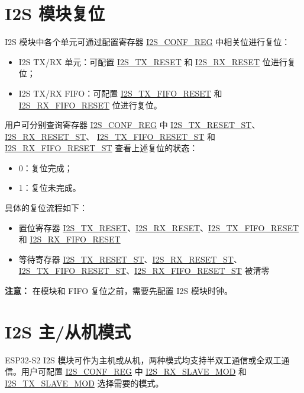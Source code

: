 \documentclass[main\_\_CN.tex]{subfiles}
\begin{document}
\section{I2S 模块复位} \label{module_reset}

I2S 模块中各个单元可通过配置寄存器 \hyperref[regdesc:I2SCONFREG]{I2S\_CONF\_REG} 中相关位进行复位：
\begin{itemize}
\item I2S TX/RX 单元：可配置 \hyperref[fielddesc:I2STXRESET]{I2S\_TX\_RESET} 和 \hyperref[fielddesc:I2SRXRESET]{I2S\_RX\_RESET} 位进行复位；
\item I2S TX/RX FIFO：可配置 \hyperref[fielddesc:I2STXFIFORESET]{I2S\_TX\_FIFO\_RESET} 和 \hyperref[fielddesc:I2SRXFIFORESET]{I2S\_RX\_FIFO\_RESET} 位进行复位。
\end{itemize}
用户可分别查询寄存器 \hyperref[regdesc:I2SCONFREG]{I2S\_CONF\_REG} 中 \hyperref[fielddesc:I2STXRESETST]{I2S\_TX\_RESET\_ST}、 \hyperref[fielddesc:I2SRXRESETST]{I2S\_RX\_RESET\_ST}、 \hyperref[fielddesc:I2STXFIFORESETST]{I2S\_TX\_FIFO\_RESET\_ST} 和 \hyperref[fielddesc:I2SRXFIFORESETST]{I2S\_RX\_FIFO\_RESET\_ST} 查看上述复位的状态：
\begin{itemize}
    \item 0：复位完成；
    \item 1：复位未完成。
\end{itemize}

具体的复位流程如下：
\begin{itemize}
    \item 置位寄存器 \hyperref[fielddesc:I2STXRESET]{I2S\_TX\_RESET}、\hyperref[fielddesc:I2SRXRESET]{I2S\_RX\_RESET}、\hyperref[fielddesc:I2STXFIFORESET]{I2S\_TX\_FIFO\_RESET} 和 \hyperref[fielddesc:I2SRXFIFORESET]{I2S\_RX\_FIFO\_RESET}
    \item 等待寄存器 \hyperref[fielddesc:I2STXRESETST]{I2S\_TX\_RESET\_ST}、\hyperref[fielddesc:I2SRXRESETST]{I2S\_RX\_RESET\_ST}、\hyperref[fielddesc:I2STXFIFORESETST]{I2S\_TX\_FIFO\_RESET\_ST}、\hyperref[fielddesc:I2SRXFIFORESETST]{I2S\_RX\_FIFO\_RESET\_ST} 被清零
\end{itemize}

{\bfseries 注意：}
  在模块和 FIFO 复位之前，需要先配置 I2S 模块时钟。


\section{I2S 主/从机模式}

ESP32-S2 I2S 模块可作为主机或从机，两种模式均支持半双工通信或全双工通信。用户可配置 \hyperref[regdesc:I2SCONFREG]{I2S\_CONF\_REG} 中 \hyperref[fielddesc:I2SRXSLAVEMOD]{I2S\_RX\_SLAVE\_MOD} 和 \hyperref[fielddesc:I2STXSLAVEMOD]{I2S\_TX\_SLAVE\_MOD} 选择需要的模式。
\end{document}
